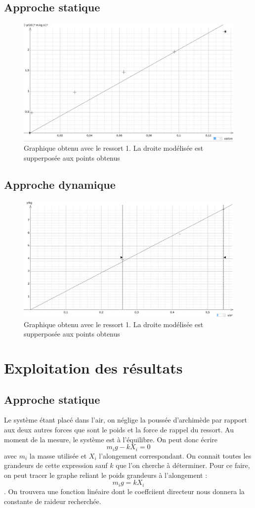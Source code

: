 \documentclass[a4paper,10pt,french]{scrartcl}
\begin{document}
\subsection{Approche statique}
\begin{figure}[H]
 \includegraphics[scale=0.3]{R1_statique}
 \caption{Graphique obtenu avec le ressort 1. La droite modélisée est supperposée aux points obtenus}
\end{figure}
\newpage
\subsection{Approche dynamique}
\begin{figure}[H]
 \includegraphics[scale=0.3]{R1_dyna}
 \caption{Graphique obtenu avec le ressort 1. La droite modélisée est supperposée aux points obtenus}
\end{figure}
\section{Exploitation des résultats}
\subsection{Approche statique}
Le système étant placé dans l'air, on néglige la poussée d'archimède par rapport aux deux autres forces que sont le poids et la force de rappel du ressort. Au moment de la mesure, le système est à l'équilibre. On peut donc écrire \[m_ig-kX_i = 0\] avec \(m_i\) la masse utilisée et \(X_i\) l'alongement correspondant. On connait toutes les grandeurs de cette expression sauf \(k\) que l'on cherche à déterminer. Pour ce faire, on peut tracer le graphe reliant le poids grandeurs à l'alongement : \[m_i g = kX_i\]. On trouvera une fonction linéaire dont le coeffciient directeur nous donnera la constante de raideur recherchée.
\end{document}
